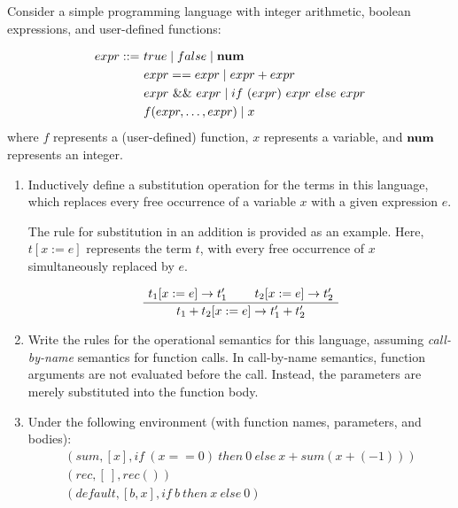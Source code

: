 \begin{exercise}{}

  Consider a simple programming language with integer arithmetic, boolean
  expressions, and user-defined functions:

  \begin{align*}
    expr ::= &~ true \mid false \mid \mathbf{num} \\
             &~ expr == expr \mid expr + expr \\
             &~ expr ~\&\& ~expr \mid if ~(expr) ~expr ~else ~expr \\
             &~ f(expr, \ldots, expr) \mid x
  \end{align*}
  where \(f\) represents a (user-defined) function, \(x\) represents a
  variable, and \(\mathbf{num}\) represents an integer.

  \begin{enumerate}
    \item Inductively define a substitution operation for the terms in this
      language, which replaces every free occurrence of a variable \(x\) with a
      given expression \(e\).

      The rule for substitution in an addition is provided as an example. Here,
      \(t[x := e]\) represents the term \(t\), with every free occurrence of \(x\)
      simultaneously replaced by \(e\).

      \begin{equation*}
        \AxiomC{\(t_1[x := e] \to t_1'\)}
        \AxiomC{\(t_2[x := e] \to t_2'\)}
        \BinaryInfC{\(t_1 + t_2[x := e] \to t_1' + t_2'\)}
        \DisplayProof
      \end{equation*}

    \item Write the rules for the operational semantics for this language,
    assuming \emph{call-by-name} semantics for function calls. In call-by-name
    semantics, function arguments are not evaluated before the call. Instead,
    the parameters are merely substituted into the function body.

    \item Under the following environment (with function names, parameters, and
    bodies):
      \begin{gather*}
        (sum, [x], if ~ (x == 0) ~ then ~ 0 ~ else ~ x + sum(x + (-1))) \\
        (rec, [~], rec()) \\
        (default, [b, x], if ~ b ~ then ~ x ~ else ~ 0)
      \end{gather*}


\end{enumerate}
\end{exercise}
